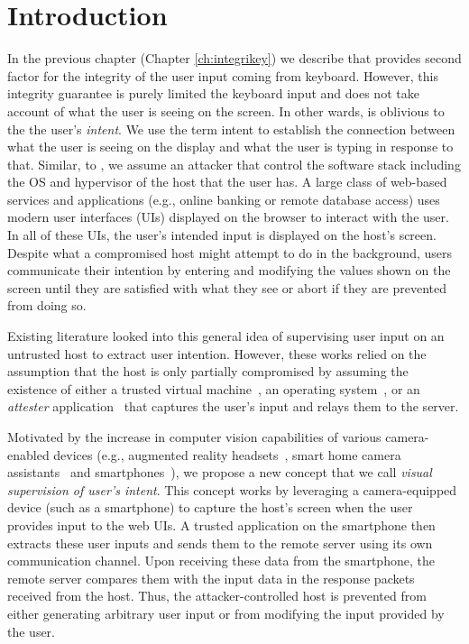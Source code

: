 \section{Introduction}
\label{integriscreen:sec:intro}

In the previous chapter (Chapter \ref{ch:integrikey}) we describe \integrikey that provides second factor for the integrity of the user input coming from keyboard. However, this integrity guarantee is purely limited the keyboard input and does not take account of what the user is seeing on the screen. In other wards, \integrikey is oblivious to the the user's \emph{intent}. We use the term intent to establish the connection between what the user is seeing on the display and what the user is typing in response to that. Similar, to \integrikey, we assume an attacker that control the software stack including the OS and hypervisor of the host that the user has. A large class of web-based services and applications (e.g., online banking or remote database access) uses modern user interfaces (UIs) displayed on the browser to interact with the user. In all of these UIs, the user's intended input is displayed on the host's screen. Despite what a compromised host might attempt to do in the background, users communicate their intention by entering and modifying the values shown on the screen until they are satisfied with what they see or abort if they are prevented from doing so.

Existing literature looked into this general idea of supervising user input on an untrusted host to extract user intention. However, these works relied on the assumption that the host is only partially compromised by assuming the existence of either a trusted virtual machine~\cite{gyrus}, an operating system~\cite{binder}, or an \emph{attester} application~\cite{nab} that captures the user's input and relays them to the server. 

Motivated by the increase in computer vision capabilities of various camera-enabled devices (e.g., augmented reality headsets~\cite{TimCookAR, HoloLens2}, smart home camera assistants~\cite{fleck2008smart, lenovoSmartHome} and smartphones~\cite{wald2018real, smartphonesCV}), we propose a new concept that we call \emph{visual supervision of user's intent}. This concept works by leveraging a camera-equipped device (such as a smartphone) to capture the host's screen when the user provides input to the web UIs. A trusted application on the smartphone then extracts these user inputs and sends them to the remote server using its own communication channel. Upon receiving these data from the smartphone, the remote server compares them with the input data in the response packets received from the host. Thus, the attacker-controlled host is prevented from either generating arbitrary user input or from modifying the input provided by the user.


